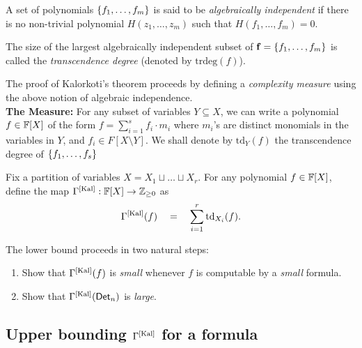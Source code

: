 \begin{definition}
  A set of polynomials $\left\{f_1,\dots, f_m\right\}$ is said to be \emph{algebraically independent} if there is no non-trivial polynomial $H(z_1,\dots, z_m)$ such that $H(f_1,\dots, f_m)=0$.

  The size of the largest algebraically independent subset of $\mathbf{f}=\left\{f_1,\dots, f_m\right\}$ is called the \emph{transcendence degree} (denoted by $\mathrm{trdeg}(f)$).
\end{definition}
The proof of Kalorkoti's theorem proceeds by defining a \emph{complexity measure} using the above notion of algebraic independence.
\\


{\bf The Measure:} 
For any subset of variables $Y\subseteq X$, we can write a polynomial $f \in \mathbb{F}[X]$ of the form $f = \sum_{i=1}^s f_i \cdot m_i$ where $m_i$'s are distinct monomials in the variables in $Y$, and $f_i \in F[X \setminus Y]$.
We shall denote by $\mathrm{td}_Y(f)$ the transcendence degree of $\left\{f_1,\dots, f_s\right\}$


Fix a partition of variables $X = X_1 \sqcup \dots \sqcup X_r$.
For any polynomial $f\in \mathbb{F}[X]$, define the map $\Gamma^{\mathrm{[Kal]}}:\mathbb{F}[X]\rightarrow \mathbb{Z}_{\geq 0}$ as
$$
\Gamma^{\mathrm{[Kal]}}(f) \quad=\quad \sum_{i=1}^r \mathrm{td}_{X_i}(f).
$$

The lower bound proceeds in two natural steps:
\begin{enumerate}
\item Show that $\Gamma^{\mathrm{[Kal]}}(f)$ is \emph{small} whenever $f$ is computable by a \emph{small} formula. 
\item Show that $\Gamma^{\mathrm{[Kal]}}(\operatorname{\mathsf{Det}}_n)$ is \emph{large}. 
\end{enumerate}

\subsection{Upper bounding $\Gamma^{\mathrm{[Kal]}}$ for a formula}

